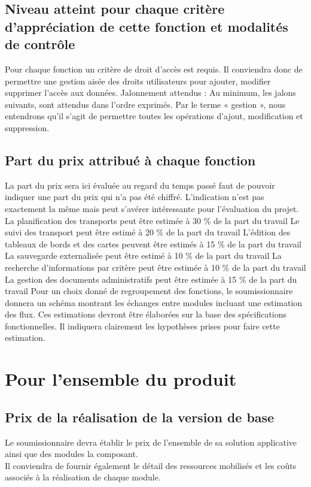 \documentclass[11pt,fleqn]{book} %
\begin{document}
\subsection{Niveau atteint pour chaque critère d'appréciation de cette fonction et modalités de contrôle}
Pour chaque fonction un critère de droit d'accès est requis. Il conviendra donc de permettre une gestion aisée des droits utilisateurs pour ajouter, modifier supprimer l'accès aux données.
Jalonnement attendus :
Au minimum, les jalons suivants, sont attendus dans l'ordre exprimés. Par le terme « gestion », nous entendrons qu'il s'agit de permettre toutes les opérations d'ajout, modification et suppression.

\subsection{Part du prix attribué à chaque fonction}
La part du prix sera ici évaluée au regard du temps passé faut de pouvoir indiquer une part du prix qui n’a pas été chiffré. L’indication n’est pas exactement la même mais peut s’avérer intéressante pour l’évaluation du projet. 
La planification des transports peut être estimée à 30 \% de la part du travail
Le suivi des transport peut être estimé à 20 \% de la part du travail
L'édition des tableaux de bords et des cartes peuvent être estimés à 15 \% de la part du travail
La sauvegarde externalisée peut être estimé à 10 \% de la part du travail
La recherche d'informations par critère peut être estimée à 10 \% de la part du travail
La gestion des documents administratifs peut être estimée à 15 \% de la part du travail
Pour un choix donné de regroupement des fonctions, le soumissionnaire donnera un schéma montrant les échanges entre modules incluant une estimation des flux. 
Ces estimations devront être élaborées sur la base des spécifications fonctionnelles. Il indiquera clairement les hypothèses prises pour faire cette estimation. 

\section{Pour l'ensemble du produit}

\subsection{Prix de la réalisation de la version de base}
Le soumissionnaire devra établir le prix de l'ensemble de sa solution applicative ainsi que des modules la composant.
\\
Il conviendra de fournir également le détail des ressources mobilisés et les coûts associés à la réalisation de chaque module. 
\end{document}

